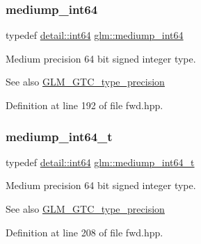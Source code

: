 \subsubsection{\texorpdfstring{mediump\+\_\+int64}{mediump\_int64}}
{\footnotesize\ttfamily typedef \hyperlink{namespaceglm_1_1detail_a5b1c3227ec636c24a0676746381adfc8}{detail\+::int64} \hyperlink{group__gtc__type__precision_ga603c695fe5cd677d3f72a81343e19a74}{glm\+::mediump\+\_\+int64}}

Medium precision 64 bit signed integer type. \begin{DoxySeeAlso}{See also}
\hyperlink{group__gtc__type__precision}{G\+L\+M\+\_\+\+G\+T\+C\+\_\+type\+\_\+precision} 
\end{DoxySeeAlso}


Definition at line 192 of file fwd.\+hpp.

\mbox{\label{group__gtc__type__precision_ga555a2f85641550c232db473a9bb981f7}} 
\subsubsection{\texorpdfstring{mediump\+\_\+int64\+\_\+t}{mediump\_int64\_t}}
{\footnotesize\ttfamily typedef \hyperlink{namespaceglm_1_1detail_a5b1c3227ec636c24a0676746381adfc8}{detail\+::int64} \hyperlink{group__gtc__type__precision_ga555a2f85641550c232db473a9bb981f7}{glm\+::mediump\+\_\+int64\+\_\+t}}

Medium precision 64 bit signed integer type. \begin{DoxySeeAlso}{See also}
\hyperlink{group__gtc__type__precision}{G\+L\+M\+\_\+\+G\+T\+C\+\_\+type\+\_\+precision} 
\end{DoxySeeAlso}


Definition at line 208 of file fwd.\+hpp.

\mbox{\label{group__gtc__type__precision_ga3ee8faab2278c44c5785af04b7b18a14}} 
